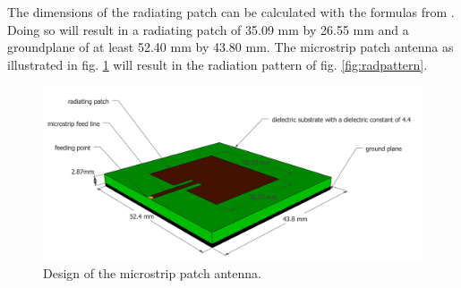 \documentclass[twocolumn]{phdsymp} %
\begin{document}
The dimensions of the radiating patch can be calculated with the formulas from \cite{J14_antennadesign, J15_antennadesign}.
Doing so will result in a radiating patch of 35.09 mm by 26.55 mm and a groundplane of at least 52.40 mm by 43.80 mm.
The microstrip patch antenna as illustrated in fig. \ref{fig:basicpatchantenna} will result in the radiation pattern of fig. \ref{fig:radpattern}.
\begin{figure}[h!]
\centering
  \includegraphics[width=\linewidth]{MicrostripAntenna.png}
  \caption{Design of the microstrip patch antenna.}
  \label{fig:basicpatchantenna}
\end{figure}
\end{document}
